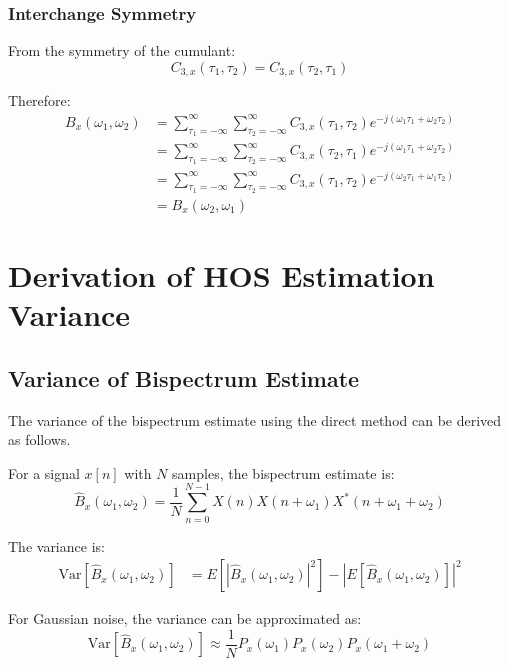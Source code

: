 \subsubsection{Interchange Symmetry}

From the symmetry of the cumulant:
\begin{equation}
C_{3,x}(\tau_1, \tau_2) = C_{3,x}(\tau_2, \tau_1)
\end{equation}

Therefore:
\begin{align}
B_x(\omega_1, \omega_2) &= \sum_{\tau_1=-\infty}^{\infty} \sum_{\tau_2=-\infty}^{\infty} C_{3,x}(\tau_1, \tau_2) e^{-j(\omega_1\tau_1 + \omega_2\tau_2)} \\
&= \sum_{\tau_1=-\infty}^{\infty} \sum_{\tau_2=-\infty}^{\infty} C_{3,x}(\tau_2, \tau_1) e^{-j(\omega_1\tau_1 + \omega_2\tau_2)} \\
&= \sum_{\tau_1=-\infty}^{\infty} \sum_{\tau_2=-\infty}^{\infty} C_{3,x}(\tau_1, \tau_2) e^{-j(\omega_2\tau_1 + \omega_1\tau_2)} \\
&= B_x(\omega_2, \omega_1)
\end{align}

\section{Derivation of HOS Estimation Variance}

\subsection{Variance of Bispectrum Estimate}

The variance of the bispectrum estimate using the direct method can be derived as follows.

For a signal $x[n]$ with $N$ samples, the bispectrum estimate is:
\begin{equation}
\hat{B}_x(\omega_1, \omega_2) = \frac{1}{N} \sum_{n=0}^{N-1} X(n)X(n+\omega_1)X^*(n+\omega_1+\omega_2)
\end{equation}

The variance is:
\begin{align}
\text{Var}[\hat{B}_x(\omega_1, \omega_2)] &= E[|\hat{B}_x(\omega_1, \omega_2)|^2] - |E[\hat{B}_x(\omega_1, \omega_2)]|^2
\end{align}

For Gaussian noise, the variance can be approximated as:
\begin{equation}
\text{Var}[\hat{B}_x(\omega_1, \omega_2)] \approx \frac{1}{N} P_x(\omega_1) P_x(\omega_2) P_x(\omega_1 + \omega_2)
\end{equation}

